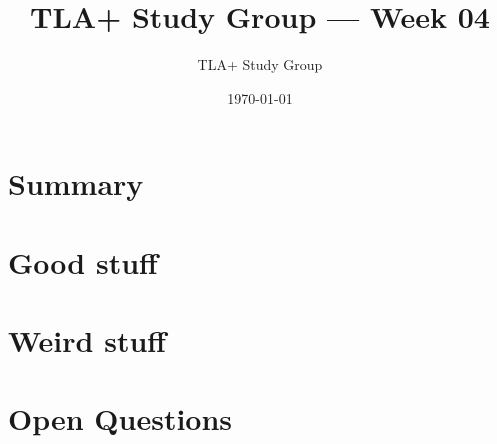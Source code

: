 \documentclass[11pt]{article}
\title{TLA+ Study Group — Week 04}
\author{TLA+ Study Group}
\date{\today}
\begin{document}
\maketitle

\section*{Summary}

\section*{Good stuff}

\section*{Weird stuff}

\section*{Open Questions}
\end{document}
